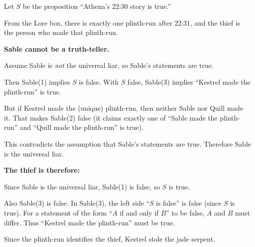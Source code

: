 \medskip


\SolutionPage

Let \(S\) be the proposition “Athena’s 22{:}30 story is true.”

From the Lore box, there is exactly one plinth-run after 22{:}31, and the thief is the person who made that plinth-run.

\medskip

\textbf{Sable cannot be a truth-teller.}

Assume Sable is \emph{not} the universal liar, so Sable’s statements are true.

Then Sable(1) implies \(S\) is false.
With \(S\) false, Sable(3) implies “Kestrel made the plinth-run” is true.

But if Kestrel made the (unique) plinth-run, then neither Sable nor Quill made it.
That makes Sable(2) false (it claims exactly one of “Sable made the plinth-run” and “Quill made the plinth-run” is true).

This contradicts the assumption that Sable’s statements are true.
Therefore Sable is the universal liar.

\medskip

\textbf{The thief is therefore: }

Since Sable is the universal liar, Sable(1) is false, so \(S\) is true.

Also Sable(3) is false. In Sable(3), the left side “\(S\) is false” is false (since \(S\) is true).
For a statement of the form “\(A\) if and only if \(B\)” to be false, \(A\) and \(B\) must differ.
Thus “Kestrel made the plinth-run” must be true.

Since the plinth-run identifies the thief, Kestrel stole the jade serpent.


\NextPage
